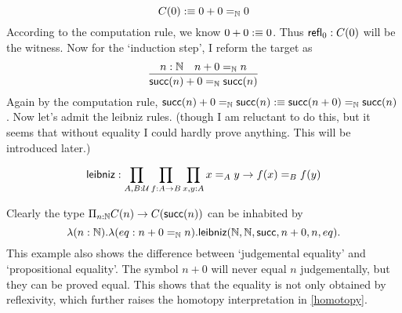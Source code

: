$$
    C(0) :\equiv 0 + 0 =_{\mathbb{N}} 0
$$
According to the computation rule, we know $0 + 0:\equiv 0$. Thus
$\text{\sf refl}_0: C(0)$ will be the witness. Now for the `induction step',
I reform the target as
$$
\infer{\succn(n) + 0 =_\nat \succn(n)}{n:\nat & n+0=_\nat n}
$$
Again by the computation rule, 
$\text{\sf succ}(n) + 0 =_{\mathbb{N}} \text{\sf succ}(n):\equiv \text{\sf succ}(n+0)=_{\mathbb{N}}\text{\sf succ}(n)$. 
Now let's admit the leibniz rules. (though I am reluctant to do this, 
but it seems that without equality I could hardly prove anything. 
This will be introduced later.)

\begin{definition}
    \label{leibniz}
    $$
    \text{\sf leibniz}: \prod_{A,B:\mathcal{U}}\prod_{f:A\to B}\prod_{x,y:A}
        x=_Ay\to f(x)=_Bf(y)
    $$ 
\end{definition}
Clearly the type $\Pi_{n:\mathbb{N}}C(n)\to C(\text{\sf succ}(n))$ can be inhabited by
$$
    \lambda (n:\mathbb{N}).\lambda (eq:n+0=_{\mathbb{N}} n). \text{\sf leibniz}
    (\mathbb{N},\mathbb{N},\text{\sf succ},n+0,n,eq). 
$$
This example also shows the difference between `judgemental equality' 
and `propositional equality'. The symbol $n+0$ will never equal $n$
judgementally, but they can be proved equal. This shows that the equality
is not only obtained by reflexivity, which further raises the homotopy
interpretation in \autoref{homotopy}.

